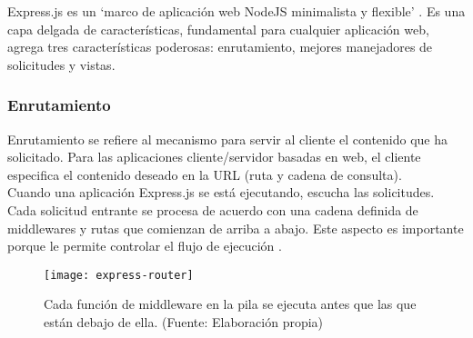 Express.js es un `marco de aplicación web NodeJS minimalista y flexible' \cite{express}. Es una capa delgada de características, fundamental para cualquier aplicación web, agrega tres características poderosas: enrutamiento, mejores manejadores de solicitudes y vistas.

\subsubsection{Enrutamiento}
Enrutamiento se refiere al mecanismo para servir al cliente el contenido que ha solicitado. Para las aplicaciones cliente/servidor basadas en web, el cliente especifica el contenido deseado en la URL (ruta y cadena de consulta).\\[0.8cm]
Cuando una aplicación Express.js se está ejecutando, escucha las solicitudes. Cada solicitud entrante se procesa de acuerdo con una cadena definida de middlewares y rutas que comienzan de arriba a abajo. Este aspecto es importante porque le permite controlar el flujo de ejecución \cite{azat}.
\vspace{0.8cm}

\begin{figure}[H]
  \centering
  \texttt{[image: express-router]}
  \caption{Cada función de middleware en la pila se ejecuta antes que las que están debajo de ella. (Fuente: Elaboración propia)}
\end{figure}

\newpage
